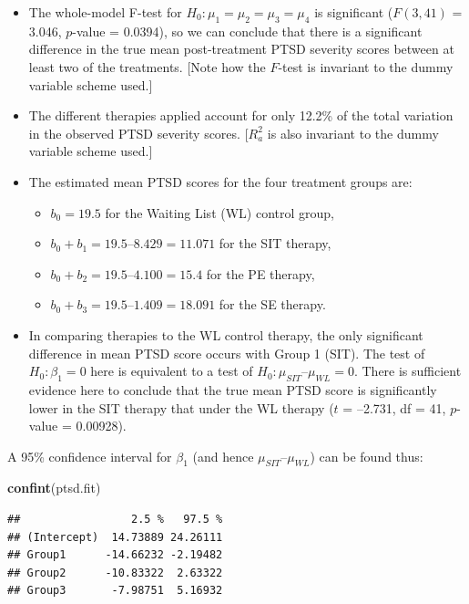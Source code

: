 \documentclass[
]{book}
\newenvironment{Shaded}{\begin{snugshade}}{\end{snugshade}}
\newcommand{\FunctionTok}[1]{\textcolor[rgb]{0.13,0.29,0.53}{\textbf{#1}}}
\newcommand{\NormalTok}[1]{#1}
\providecommand{\tightlist}{%
  \setlength{\itemsep}{0pt}\setlength{\parskip}{0pt}}
\begin{document}
\begin{itemize}
\tightlist
\item
  The whole-model F-test for \(H_0: \mu_1 = \mu_2 = \mu_3 = \mu_4\) is significant (\(F(3, 41)\) = 3.046, \(p\)-value = 0.0394), so we can conclude that there is a significant difference in the true mean post-treatment PTSD severity scores between at least two of the treatments. {[}Note how the \(F\)-test is invariant to the dummy variable scheme used.{]}
\item
  The different therapies applied account for only 12.2\% of the total variation in the observed PTSD severity scores. {[}\(R_a^2\) is also invariant to the dummy variable scheme used.{]}
\item
  The estimated mean PTSD scores for the four treatment groups are:

  \begin{itemize}
  \tightlist
  \item
    \(b_0 = 19.5\) for the Waiting List (WL) control group,
  \item
    \(b_0 + b_1 = 19.5 – 8.429 = 11.071\) for the SIT therapy,
  \item
    \(b_0 + b_2 = 19.5 – 4.100 = 15.4\) for the PE therapy,
  \item
    \(b_0 + b_3 = 19.5 – 1.409 = 18.091\) for the SE therapy.
  \end{itemize}
\item
  In comparing therapies to the WL control therapy, the only significant difference in mean PTSD score occurs with Group 1 (SIT). The test of \(H_0: \beta_1 = 0\) here is equivalent to a test of \(H_0: \mu_{SIT} – \mu_{WL} = 0.\) There is sufficient evidence here to conclude that the true mean PTSD score is significantly lower in the SIT therapy that under the WL therapy (\(t\) = --2.731, df = 41, \(p\)-value = 0.00928).
\end{itemize}

A 95\% confidence interval for \(\beta_1\) (and hence \(\mu_{SIT} – \mu_{WL}\)) can be found thus:

\begin{Shaded}
\begin{Highlighting}[]
\FunctionTok{confint}\NormalTok{(ptsd.fit)}
\end{Highlighting}
\end{Shaded}

\begin{verbatim}
##                 2.5 %   97.5 %
## (Intercept)  14.73889 24.26111
## Group1      -14.66232 -2.19482
## Group2      -10.83322  2.63322
## Group3       -7.98751  5.16932
\end{verbatim}
\end{document}
